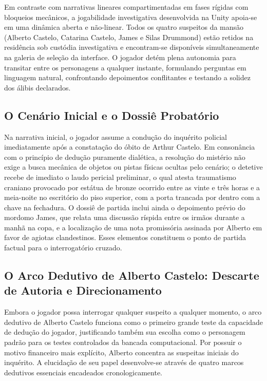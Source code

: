 Em contraste com narrativas lineares compartimentadas em fases rígidas com bloqueios mecânicos, a jogabilidade investigativa desenvolvida na Unity apoia-se em uma dinâmica aberta e não-linear. Todos os quatro suspeitos da mansão (Alberto Castelo, Catarina Castelo, James e Silas Drummond) estão retidos na residência sob custódia investigativa e encontram-se disponíveis simultaneamente na galeria de seleção da interface. O jogador detém plena autonomia para transitar entre os personagens a qualquer instante, formulando perguntas em linguagem natural, confrontando depoimentos conflitantes e testando a solidez dos álibis declarados.

\subsection{O Cenário Inicial e o Dossiê Probatório}
\label{subsec:met_cenario_dossie}
Na narrativa inicial, o jogador assume a condução do inquérito policial imediatamente após a constatação do óbito de Arthur Castelo. Em consonância com o princípio de dedução puramente dialética, a resolução do mistério não exige a busca mecânica de objetos ou pistas físicas ocultas pelo cenário; o detetive recebe de imediato o laudo pericial preliminar, o qual atesta traumatismo craniano provocado por estátua de bronze ocorrido entre as vinte e três horas e a meia-noite no escritório do piso superior, com a porta trancada por dentro com a chave na fechadura. O dossiê de partida inclui ainda o depoimento prévio do mordomo James, que relata uma discussão ríspida entre os irmãos durante a manhã na copa, e a localização de uma nota promissória assinada por Alberto em favor de agiotas clandestinos. Esses elementos constituem o ponto de partida factual para o interrogatório cruzado.

\subsection{O Arco Dedutivo de Alberto Castelo: Descarte de Autoria e Direcionamento}
\label{subsec:met_arco_alberto}
Embora o jogador possa interrogar qualquer suspeito a qualquer momento, o arco dedutivo de Alberto Castelo funciona como o primeiro grande teste da capacidade de dedução do jogador, justificando também sua escolha como o personagem padrão para os testes controlados da bancada computacional. Por possuir o motivo financeiro mais explícito, Alberto concentra as suspeitas iniciais do inquérito. A elucidação de seu papel desenvolve-se através de quatro marcos dedutivos essenciais encadeados cronologicamente.

